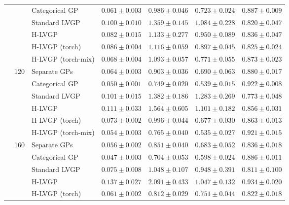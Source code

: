 \begin{table}[htbp]
\begin{tabular}{lllrrrr}
 &  & Categorical GP & \colorbox{green!20}{\boldmath$0.061 \pm 0.003$} & \colorbox{green!20}{\boldmath$0.986 \pm 0.046$} & \colorbox{green!20}{\boldmath$0.723 \pm 0.024$} & \colorbox{green!20}{\boldmath$0.887 \pm 0.009$} \\
 &  & Standard LVGP & $0.100 \pm 0.010$ & $1.359 \pm 0.145$ & $1.084 \pm 0.228$ & $0.820 \pm 0.047$ \\
 &  & H-LVGP & $0.082 \pm 0.015$ & $1.133 \pm 0.277$ & $0.950 \pm 0.089$ & $0.836 \pm 0.047$ \\
 &  & H-LVGP (torch) & $0.086 \pm 0.004$ & $1.116 \pm 0.059$ & $0.897 \pm 0.045$ & $0.825 \pm 0.024$ \\
 &  & H-LVGP (torch-mix) & $0.068 \pm 0.004$ & $1.093 \pm 0.057$ & $0.771 \pm 0.055$ & $0.873 \pm 0.023$ \\
\cmidrule(lr){2-7}
 & \multirow{6}{*}{120} & Separate GPs & $0.064 \pm 0.003$ & $0.903 \pm 0.036$ & $0.690 \pm 0.063$ & $0.880 \pm 0.017$ \\
 &  & Categorical GP & \colorbox{green!20}{\boldmath$0.050 \pm 0.001$} & \colorbox{green!20}{\boldmath$0.749 \pm 0.020$} & $0.539 \pm 0.015$ & \colorbox{green!20}{\boldmath$0.922 \pm 0.008$} \\
 &  & Standard LVGP & $0.101 \pm 0.015$ & $1.382 \pm 0.186$ & $1.283 \pm 0.269$ & $0.773 \pm 0.048$ \\
 &  & H-LVGP & $0.111 \pm 0.033$ & $1.564 \pm 0.605$ & $1.101 \pm 0.182$ & $0.856 \pm 0.031$ \\
 &  & H-LVGP (torch) & $0.073 \pm 0.002$ & $0.996 \pm 0.044$ & $0.677 \pm 0.030$ & $0.863 \pm 0.013$ \\
 &  & H-LVGP (torch-mix) & $0.054 \pm 0.003$ & $0.765 \pm 0.040$ & \colorbox{green!20}{\boldmath$0.535 \pm 0.027$} & $0.921 \pm 0.015$ \\
\cmidrule(lr){2-7}
 & \multirow{6}{*}{160} & Separate GPs & $0.056 \pm 0.002$ & $0.851 \pm 0.040$ & $0.683 \pm 0.052$ & $0.836 \pm 0.018$ \\
 &  & Categorical GP & \colorbox{green!20}{\boldmath$0.047 \pm 0.003$} & \colorbox{green!20}{\boldmath$0.704 \pm 0.053$} & $0.598 \pm 0.024$ & $0.886 \pm 0.011$ \\
 &  & Standard LVGP & $0.075 \pm 0.008$ & $1.048 \pm 0.107$ & $0.948 \pm 0.391$ & $0.811 \pm 0.100$ \\
 &  & H-LVGP & $0.137 \pm 0.027$ & $2.091 \pm 0.433$ & $1.047 \pm 0.132$ & \colorbox{green!20}{\boldmath$0.934 \pm 0.020$} \\
 &  & H-LVGP (torch) & $0.061 \pm 0.002$ & $0.812 \pm 0.029$ & $0.751 \pm 0.044$ & $0.822 \pm 0.018$ \\

\end{tabular}
\end{table}
